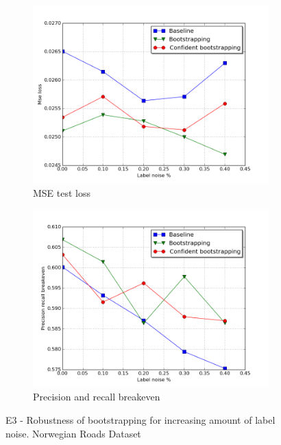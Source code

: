 \begin{figure}[p]
\begin{subfigure}{0.48\textwidth}
\includegraphics[width=\linewidth]{figs/E5/E5_lc_noise.png}
\caption{MSE test loss} \label{fig:E5_boot_norway_loss}
\end{subfigure}
\hspace*{\fill} %
\begin{subfigure}{0.48\textwidth}
\includegraphics[width=\linewidth]{figs/E5/E5_pr_noise.png}
\caption{Precision and recall breakeven} \label{fig:E5_boot_norway_pr}
\end{subfigure}
\hspace*{\fill} %
\caption{E3 - Robustness of bootstrapping for increasing amount of label noise. Norwegian Roads Dataset} \label{fig:E5_boot_norway}
\end{figure}

